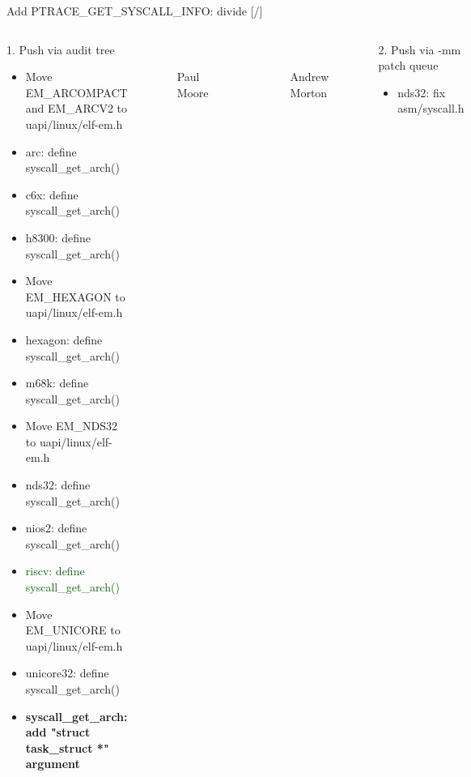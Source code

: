 \documentclass[unicode,aspectratio=169,xcolor={table,dvipsnames,usernames}]{beamer}
\begin{document}
\begin{frame}[fragile]{Add PTRACE\_GET\_SYSCALL\_INFO: divide \hfill [\insertframenumber/\inserttotalframenumber]}
\Large
\begin{columns}
	\column{6.5cm}
		\begin{block}{1. Push via audit tree}
	\begin{itemize}
		\scriptsize
		\item Move EM\_ARCOMPACT and EM\_ARCV2 to uapi/linux/elf-em.h
		\item arc: define syscall\_get\_arch()
		\item c6x: define syscall\_get\_arch()
		\item h8300: define syscall\_get\_arch()
		\item Move EM\_HEXAGON to uapi/linux/elf-em.h
		\item hexagon: define syscall\_get\_arch()
		\item m68k: define syscall\_get\_arch()
		\item Move EM\_NDS32 to uapi/linux/elf-em.h
		\item nds32: define syscall\_get\_arch()
		\item nios2: define syscall\_get\_arch()
		\item \textcolor{darkgreen}{riscv: define syscall\_get\_arch()}
		\item Move EM\_UNICORE to uapi/linux/elf-em.h
		\item unicore32: define syscall\_get\_arch()
		\item \textbf{syscall\_get\_arch: \\ add "struct task\_struct *" argument}
	\end{itemize}
		\end{block}
	\column{6.5cm}
		\begin{columns}
			\column{3cm}
				\begin{figure}
					\centering
					\scriptsize
					 \\
					Paul Moore
				\end{figure}
			\column{3cm}
				\begin{figure}
					\centering
					\scriptsize
					 \\
					Andrew Morton
				\end{figure}
		\end{columns}
		\begin{block}{2. Push via -mm patch queue}
	\begin{itemize}
		\scriptsize
		\item nds32: fix asm/syscall.h

\end{itemize}
\end{block}
\end{columns}
\end{frame}
\end{document}
